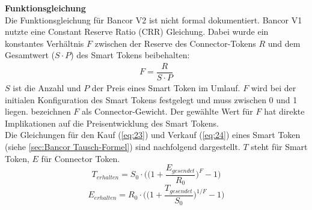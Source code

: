 \documentclass[12pt,a4paper,titlepage,oneside,english]{article}
\begin{document}
\textbf{Funktionsgleichung} \\
Die Funktionsgleichung für Bancor V2 ist nicht formal dokumentiert. Bancor V1 nutzte eine Constant Reserve Ratio (CRR) Gleichung. Dabei wurde ein konstantes Verhältnis $F$ zwischen der Reserve des Connector-Tokens $R$ und dem Gesamtwert ($S \cdot P$) des Smart Tokens beibehalten: \citep[vgl.][S.1]{Rosenfeld2017} \\%
\begin{align}
F = \dfrac{R}{S \cdot P}  \label{eq:21} 
\end{align} %
$S$ ist die Anzahl und $P$ der Preis eines Smart Token im Umlauf. $F$ wird bei der initialen Konfiguration des Smart Tokens festgelegt und muss zwischen 0 und 1 liegen. \citet{Hertzog2018} bezeichnen $F$ als Connector-Gewicht. Der gewählte Wert für $F$ hat direkte Implikationen auf die Preisentwicklung des Smart Tokens. \citep[vgl.][S.9]{Hertzog2018}\\
Die Gleichungen für den Kauf (\ref{eq:23}) und Verkauf (\ref{eq:24}) eines Smart Token (siehe \ref{sec:Bancor Tausch-Formel}) sind nachfolgend dargestellt. $T$ steht für Smart Token, $E$ für Connector Token. \citep[vgl.][S.2]{Rosenfeld2017}
\begin{equation}
T_{erhalten}  = S_{0} \cdot \Biggl(\biggl(1+\dfrac{E_{gesendet}}{R_{0}}\biggr)^{F} -1 \Biggr) \label{eq:23}
\end{equation}
\begin{equation}
E_{erhalten} = R_{0} \cdot \Biggl(\biggl(1+\dfrac{T_{gesendet}}{S_{0}}\biggr)^{1/F} -1\Biggr) \label{eq:24}
\end{equation}
\end{document}

